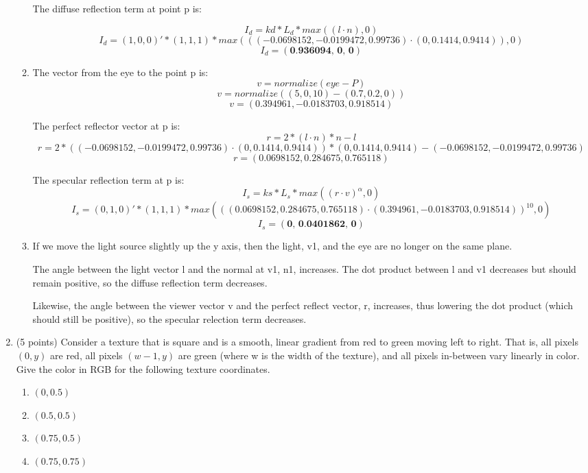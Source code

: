 \documentclass[12pt]{letter}
\begin{document}
\begin{enumerate}
\begin{enumerate}
		The diffuse reflection term at point p is:
		
		$$ I_{d} = kd*L_d*max((l \cdot n), 0)$$
		$$ I_{d} = (1, 0, 0)' * (1, 1, 1) * max(((-0.0698152, -0.0199472, 0.99736) \cdot (0, 0.1414, 0.9414)), 0)$$
		$$ I_{d} = (\textbf{0.936094, 0, 0}) $$
	
		\item
		The vector from the eye to the point p is:
		$$ v = normalize(eye - P) $$
		$$ v = normalize((5, 0, 10) - (0.7, 0.2, 0)) $$
		$$ v = (0.394961, -0.0183703, 0.918514) $$
		
		The perfect reflector vector at p is:
		$$ r = 2*(l \cdot n)*n - l $$
		$$ r = 2*((-0.0698152, -0.0199472, 0.99736) \cdot (0, 0.1414, 0.9414))*(0, 0.1414, 0.9414) - (-0.0698152, -0.0199472, 0.99736) $$
		$$ r = (0.0698152, 0.284675, 0.765118) $$
		
		The specular reflection term at p is:
		$$ I_s = ks * L_s * max((r \cdot v)^\alpha, 0) $$
		$$ I_s = (0, 1, 0)' * (1, 1, 1) * max(((0.0698152, 0.284675, 0.765118) \cdot (0.394961, -0.0183703, 0.918514))^{10}, 0) $$
		$$ I_s = (\textbf{0, 0.0401862, 0}) $$

		\item
		If we move the light source slightly up the y axis, then the light, v1, and the eye are no longer on the same plane.
		
		The angle between the light vector l and the normal at v1, n1, increases. The dot product between l and v1 decreases but should remain positive, so the diffuse reflection term decreases.
		
		Likewise, the angle between the viewer vector v and the perfect reflect vector, r, increases, thus lowering the dot product (which should still be positive), so the specular relection term decreases.
	\end{enumerate}
	
	\item (5 points)
	Consider a texture that is square and is a smooth, linear gradient from red to green moving left to right.
	That is, all pixels $(0, y)$ are red, all pixels $(w − 1, y)$ are green (where w is the width of
the texture), and all pixels in-between vary linearly in color. Give the color in RGB for the following
texture coordinates.
	\begin{enumerate}
		\item $(0, 0.5)$
		\item $(0.5, 0.5)$
		\item $(0.75, 0.5)$
		\item $(0.75, 0.75)$
	\end{enumerate}


\end{enumerate}
\end{document}
